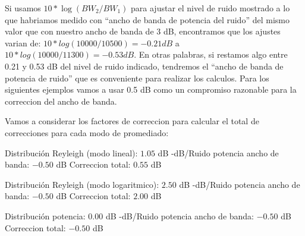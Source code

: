 \documentclass[a4paper,12pt,twoside]{article}
\newcommand{\quotes}[1]{``#1''}
\begin{document}
Si usamos $10*\log(BW_{2}/BW_{1})$ para ajustar el nivel de ruido mostrado a lo que habriamos medido con \quotes{ancho de banda de potencia del ruido} del mismo valor que con nuestro ancho de banda de 3 dB, encontramos que los ajustes varian de: $10*log(10000/10500) = -0.21dB$ a $10*log(10000/11300)=-0.53 dB$. En otras palabras, si restamos algo entre 0.21 y 0.53 dB del nivel de ruido indicado, tendremos el \quotes{ancho de banda de potencia de ruido} que es conveniente para realizar los calculos. Para los siguientes ejemplos vamos a usar 0.5 dB como un compromiso razonable para la correccion del ancho de banda.
\newline

Vamos a considerar los factores de correccion para calcular el total de correcciones para cada modo de promediado:
\newline

\newline
Distribución Reyleigh (modo lineal): $1.05$ dB -dB/Ruido potencia ancho de banda:  $-0.50$ dB \newline
Correccion total: $0.55$ dB
\newline

\newline
Distribución Reyleigh (modo logaritmico): $2.50$ dB -dB/Ruido potencia ancho de banda:  $-0.50$ dB \newline
Correccion total: $2.00$ dB
\newline
  
\newline
Distribución potencia: $0.00$ dB -dB/Ruido potencia ancho de banda:  $-0.50$ dB \newline
Correccion total: $-0.50$ dB
\end{document}
